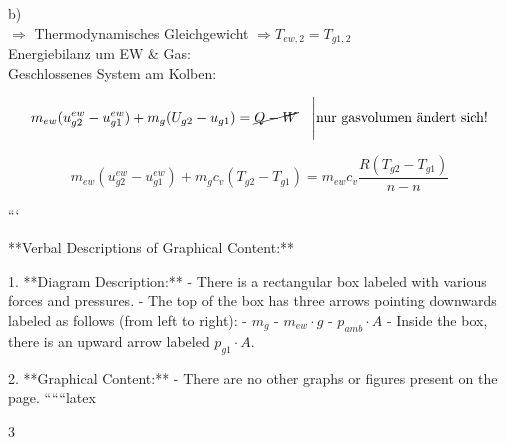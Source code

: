 b) \\
\quad $\Rightarrow$ Thermodynamisches Gleichgewicht $\Rightarrow T_{ew,2} = T_{g1,2}$ \\
\quad Energiebilanz um EW \& Gas: \\
\quad Geschlossenes System am Kolben:

\[
m_{ew} (u_{g2}^{ew} - u_{g1}^{ew}) + m_g (U_{g2} - u_{g1}) = \cancel{Q - W} \quad \Bigg| \text{nur gasvolumen ändert sich!}
\]

\[
m_{ew} (u_{g2}^{ew} - u_{g1}^{ew}) + m_g c_v (T_{g2} - T_{g1}) = m_{ew} c_v \frac{R (T_{g2} - T_{g1})}{n - n}
\]

```

**Verbal Descriptions of Graphical Content:**

1. **Diagram Description:**
   - There is a rectangular box labeled with various forces and pressures.
   - The top of the box has three arrows pointing downwards labeled as follows (from left to right):
     - $m_g$
     - $m_{ew} \cdot g$
     - $p_{amb} \cdot A$
   - Inside the box, there is an upward arrow labeled $p_{g1} \cdot A$.

2. **Graphical Content:**
   - There are no other graphs or figures present on the page.
``````latex


3